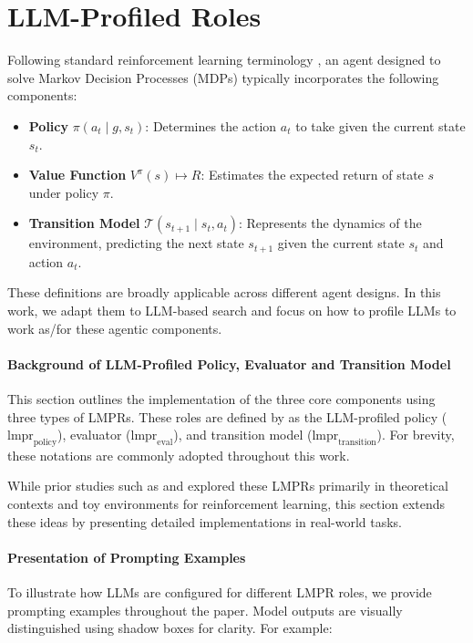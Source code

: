\section{LLM-Profiled Roles}
\label{sec:lmprs}
Following standard reinforcement learning terminology \citep{sutton2018reinforcement}, an agent designed to solve Markov Decision Processes (MDPs) typically incorporates the following components:
\begin{itemize}
    \item \textbf{Policy} $\pi(a_t \mid g, s_t)$: Determines the action $a_t$ to take given the current state $s_t$.
    
    \item \textbf{Value Function} $V^\pi(s) \mapsto R$: Estimates the expected return of state $s$ under policy $\pi$.
    
    \item \textbf{Transition Model} $\mathcal{T}(s_{t+1} \mid s_t, a_t)$: Represents the dynamics of the environment, predicting the next state $s_{t+1}$ given the current state $s_t$ and action $a_t$.
\end{itemize}
These definitions are broadly applicable across different agent designs. In this work, we adapt them to LLM-based search and focus on how to profile LLMs to work as/for these agentic components.

\paragraph{Background of LLM-Profiled Policy, Evaluator and Transition Model}
This section outlines the implementation of the three core components using three types of LMPRs. These roles are defined by  \citet{li2024survey} as the LLM-profiled policy ($\text{lmpr}_\text{policy}$), evaluator ($\text{lmpr}_\text{eval}$), and transition model ($\text{lmpr}_\text{transition}$). For brevity, these notations are commonly adopted throughout this work. 

While prior studies such as \citet{spiegel2024informing} and \citet{feng2024naturallanguagereinforcementlearning} explored these LMPRs primarily in theoretical contexts and toy environments for reinforcement learning, this section extends these ideas by presenting detailed implementations in real-world tasks. 

\paragraph{Presentation of Prompting Examples}
To illustrate how LLMs are configured for different LMPR roles, we provide prompting examples throughout the paper. Model outputs are visually distinguished using shadow boxes for clarity. For example:

